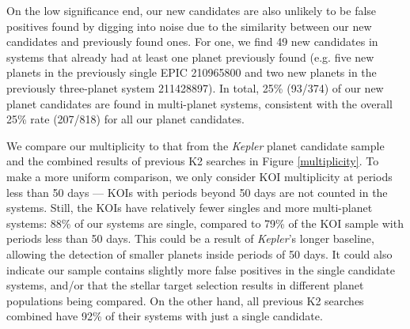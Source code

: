 \documentclass[twocolumn]{aastex62}
\newcommand{\project}[1]{\textsl{#1}}
\newcommand{\nplanet}{818}
\newcommand{\fracsingle}{88}
\newcommand{\newmult}{49}
\newcommand{\nnewinmulti}{93}
\newcommand{\nnew}{374}
\newcommand{\fracnewinmulti}{25}
\newcommand{\ninmulti}{207}
\newcommand{\fracinmulti}{25}
\begin{document}
On the low significance end, our new candidates are also unlikely to
be false positives found by digging into noise due to the similarity
between our new candidates and previously found ones. For one, we find
\newmult{} new candidates in systems that already had at least one
planet previously found (e.g. five new planets in the previously
single EPIC 210965800 and two new planets in the previously
three-planet system 211428897). In total, \fracnewinmulti{}\%
(\nnewinmulti{}/\nnew{}) of our new planet candidates are found in
multi-planet systems, consistent with the overall \fracinmulti{}\%
rate (\ninmulti{}/\nplanet{}) for all our planet candidates.

We compare our multiplicity to that from the \project{Kepler} planet
candidate sample and the combined results of previous K2 searches in
Figure \ref{multiplicity}. To make a more uniform comparison, we only
consider KOI multiplicity at periods less than 50 days --- KOIs with
periods beyond 50 days are not counted in the systems. Still, the KOIs
have relatively fewer singles and more multi-planet systems:
\fracsingle{}\% of our systems are single, compared to 79\% of the KOI
sample with periods less than 50 days.  This could be a result of
\project{Kepler}'s longer baseline, allowing the detection of smaller
planets inside periods of 50 days. It could also indicate our sample
contains slightly more false positives in the single candidate
systems, and/or that the stellar target selection results in different
planet populations being compared. On the other hand, all previous K2
searches combined have 92\% of their systems with just a single
candidate.
\end{document}
